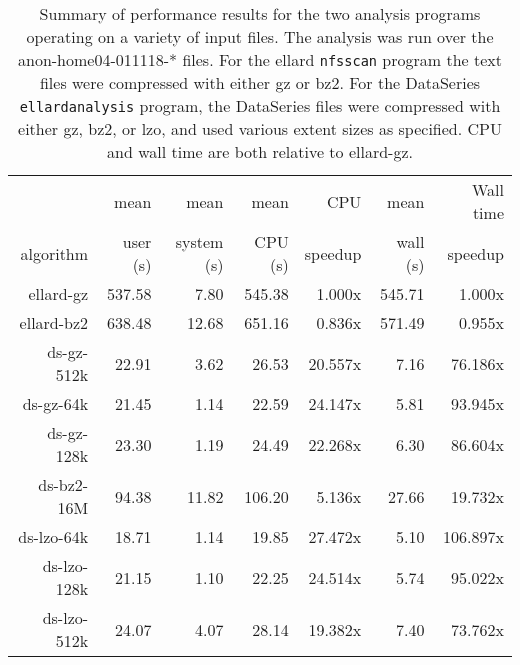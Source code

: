 \documentclass{acm_proc_article-sp}
\begin{document}
{%
%
 
\begin{table*}
\centering
\begin{tabular}{|r|r|r|r|r|r|r|} \hline
            & mean     & mean       & mean     & CPU     & mean     & Wall time \\
algorithm   & user (s) & system (s) & CPU (s)  & speedup & wall (s) & speedup  \\ \hline
ellard-gz   & 537.58    &  7.80     & 545.38   &  1.000x & 545.71   &   1.000x \\
ellard-bz2  & 638.48    & 12.68     & 651.16   &  0.836x & 571.49   &   0.955x \\
\hline
ds-gz-512k  &  22.91    &  3.62     &  26.53   & 20.557x &   7.16   &  76.186x \\
ds-gz-64k   &  21.45    &  1.14     &  22.59   & 24.147x &   5.81   &  93.945x \\
ds-gz-128k  &  23.30    &  1.19     &  24.49   & 22.268x &   6.30   &  86.604x \\
\hline
ds-bz2-16M  &  94.38    & 11.82     & 106.20   &  5.136x &  27.66   &  19.732x \\
\hline
ds-lzo-64k  &  18.71    &  1.14     &  19.85   & 27.472x &   5.10   & 106.897x \\
ds-lzo-128k &  21.15    &  1.10     &  22.25   & 24.514x &   5.74   &  95.022x \\
ds-lzo-512k &  24.07    &  4.07     &  28.14   & 19.382x &   7.40   &  73.762x \\ \hline
\end{tabular}

\caption{
Summary of performance results for the two analysis programs
operating on a variety of input files.  The analysis was run over the
anon-home04-011118-* files.  For the ellard {\tt nfsscan} program
the text files were compressed with either gz or bz2.  For the
DataSeries {\tt ellardanalysis} program, the DataSeries files were
compressed with either gz, bz2, or lzo, and used various extent sizes
as specified.  CPU and wall time are both relative to ellard-gz.
}


\end{table*}}
\end{document}
